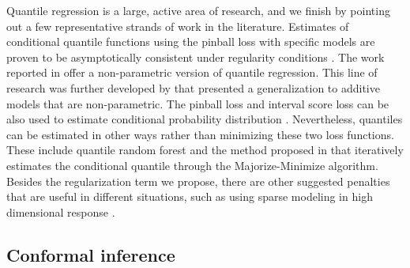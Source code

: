 \documentclass{article}
\begin{document}
Quantile regression is a large, active area of research, and we finish by pointing out a few representative strands of work in the literature. Estimates of conditional quantile functions using the pinball loss with specific models are proven to be asymptotically consistent under regularity conditions \cite{estimating_cond_quantiles_pinball}. The work reported in \cite{non_parametric_qr, qr_conf_sets, hetero_qr} offer a non-parametric version of quantile regression. This line of research was further developed by \cite{additive_qr} that presented a generalization to additive models that are non-parametric. 
The pinball loss and interval score loss can be also used to estimate conditional probability distribution \cite{qr_conditional_density,interval_score_loss}. 
Nevertheless, quantiles can be estimated in other ways rather than minimizing these two loss functions. These include quantile random forest \cite{quantile_regression_forests} and the method proposed in \cite{qr_mm} that iteratively estimates the conditional quantile through the Majorize-Minimize algorithm. Besides the regularization term we propose, there are other suggested penalties that are useful in different situations, such as using sparse modeling in high dimensional response \cite{high_dimensional_sparse, high_dimensional_qr, high_dimensional_sparse2}.


\subsection{Conformal inference}
\end{document}

